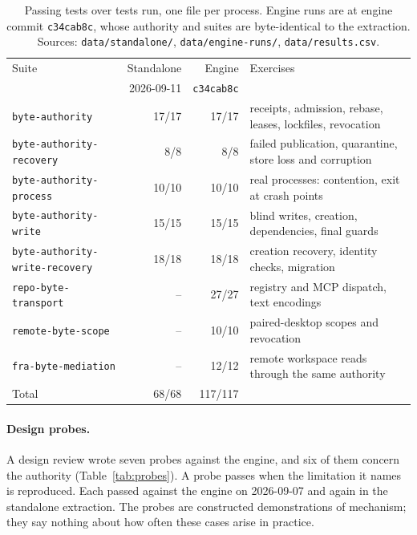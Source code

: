 \documentclass[10pt]{article}
\newcommand{\code}[1]{\texttt{#1}}
\begin{document}
\begin{table}[t]
\centering\small
\begin{tabular}{@{}lrrp{5.6cm}@{}}
\toprule
Suite & Standalone & Engine & Exercises \\
 & 2026-09-11 & \code{c34cab8c} & \\
\midrule
\code{byte-authority} & 17/17 & 17/17 & receipts, admission, rebase, leases, lockfiles, revocation \\
\code{byte-authority-recovery} & 8/8 & 8/8 & failed publication, quarantine, store loss and corruption \\
\code{byte-authority-process} & 10/10 & 10/10 & real processes: contention, exit at crash points \\
\code{byte-authority-write} & 15/15 & 15/15 & blind writes, creation, dependencies, final guards \\
\code{byte-authority-write-recovery} & 18/18 & 18/18 & creation recovery, identity checks, migration \\
\code{repo-byte-transport} & -- & 27/27 & registry and MCP dispatch, text encodings \\
\code{remote-byte-scope} & -- & 10/10 & paired-desktop scopes and revocation \\
\code{fra-byte-mediation} & -- & 12/12 & remote workspace reads through the same authority \\
\midrule
Total & 68/68 & 117/117 & \\
\bottomrule
\end{tabular}
\caption{Passing tests over tests run, one file per process. Engine runs are at engine commit \code{c34cab8c}, whose authority and suites are byte-identical to the extraction. Sources: \code{data/standalone/}, \code{data/engine-runs/}, \code{data/results.csv}.}
\label{tab:suites}
\end{table}

\paragraph{Design probes.}
A design review wrote seven probes against the engine, and six of them concern the authority (Table~\ref{tab:probes}). A probe passes when the limitation it names is reproduced. Each passed against the engine on 2026-09-07 and again in the standalone extraction. The probes are constructed demonstrations of mechanism; they say nothing about how often these cases arise in practice.
\end{document}
